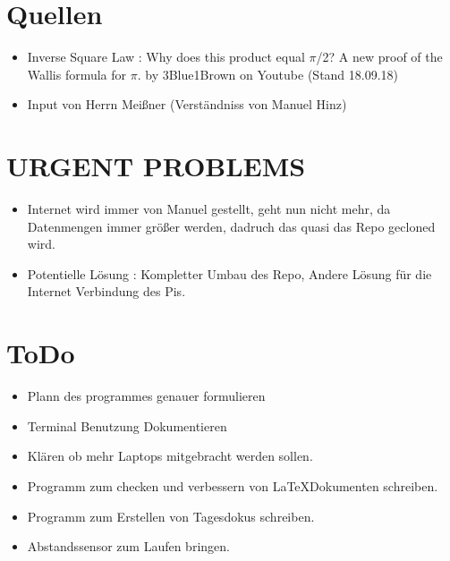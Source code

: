 \documentclass{article}
\begin{document}
\section{Quellen}

\begin{itemize}

\item Inverse Square Law : Why does this product equal $\pi$/2? A new proof of the Wallis formula for $\pi$. by 3Blue1Brown on Youtube (Stand 18.09.18)

\item Input von Herrn Meißner (Verständniss von Manuel Hinz)

\end{itemize}

\section{URGENT PROBLEMS}

\begin{itemize}

\item Internet wird immer von Manuel gestellt, geht nun nicht mehr, da Datenmengen immer größer werden, dadruch das quasi das Repo gecloned wird.

\item Potentielle Lösung : Kompletter Umbau des Repo, Andere Lösung für die Internet Verbindung des Pis. 

\end{itemize}

\section{ToDo}

\begin{itemize}

\item Plann des programmes genauer formulieren

\item Terminal Benutzung Dokumentieren

\item Kl\"{a}ren ob mehr Laptops mitgebracht werden sollen.

\item Programm zum checken und verbessern von \LaTeX Dokumenten schreiben.

\item Programm zum Erstellen von Tagesdokus schreiben.

\item Abstandssensor zum Laufen bringen.

\end{itemize}
\end{document}
